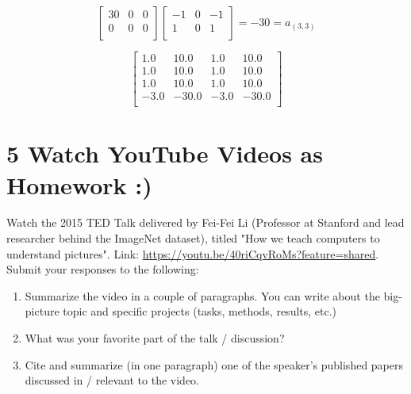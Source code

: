 \documentclass[11pt]{article}
\theoremstyle{plain}
\begin{document}
\[
	\begin{bmatrix}
		30 & 0 & 0 \\
		0  & 0 & 0 \\
	\end{bmatrix}
	\begin{bmatrix}
		-1 & 0 & -1 \\
		1  & 0 & 1  \\
	\end{bmatrix}
	= -30 = a_{(3,3)}
\]

\[
	\begin{bmatrix}
		1.0  & 10.0  & 1.0  & 10.0  \\
		1.0  & 10.0  & 1.0  & 10.0  \\
		1.0  & 10.0  & 1.0  & 10.0  \\
		-3.0 & -30.0 & -3.0 & -30.0 \\
	\end{bmatrix}
\]


\section*{5 Watch YouTube Videos as Homework :)   }

Watch the 2015 TED Talk delivered by Fei-Fei Li (Professor at Stanford and lead researcher behind the ImageNet dataset), titled "How we teach computers to understand pictures".  Link: \url{https://youtu.be/40riCqvRoMs?feature=shared}.  \\
Submit your responses to the following:
\begin{enumerate}
	\item Summarize the video in a couple of paragraphs. You can write about the big-picture topic and specific projects (tasks, methods, results, etc.)
	\item What was your favorite part of the talk / discussion?
	\item Cite and summarize (in one paragraph) one of the speaker's published papers discussed in /  relevant to the video.
\end{enumerate}
\end{document}
